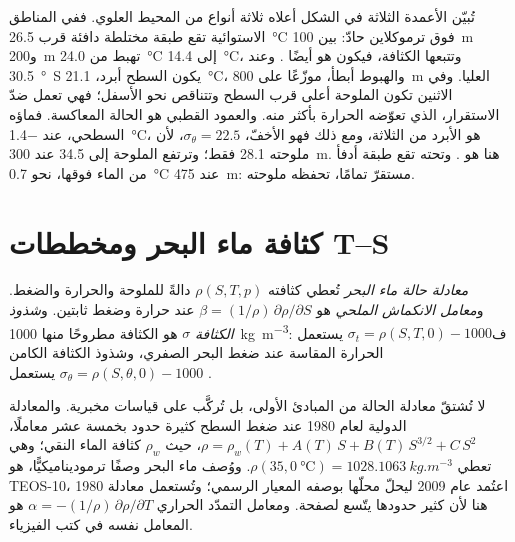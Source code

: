 تُبيّن الأعمدة الثلاثة في الشكل أعلاه ثلاثة أنواع من المحيط العلوي. ففي المناطق الاستوائية تقع طبقة مختلطة دافئة قرب \qty{26.5}{\celsius} فوق ترموكلاين حادّ: بين \qty{100}{m} و\qty{200}{m} تهبط  من \qty{24.0}{\celsius} إلى \qty{14.4}{\celsius}، وتتبعها الكثافة، فيكون  هو أيضًا . وعند \qty{30.5}{\degree S} يكون السطح أبرد، \qty{21.1}{\celsius}، والهبوط أبطأ، موزّعًا على \qty{800}{m} العليا. وفي الاثنين تكون الملوحة أعلى قرب السطح وتتناقص نحو الأسفل؛ فهي تعمل ضدّ الاستقرار، الذي تعوّضه الحرارة بأكثر منه. والعمود القطبي هو الحالة المعاكسة. فماؤه السطحي، عند \qty{-1.4}{\celsius}، هو الأبرد من الثلاثة، ومع ذلك فهو الأخفّ، $\sigma_\theta = 22.5$، لأن ملوحته \num{28.1} فقط؛ وترتفع الملوحة إلى \num{34.5} عند \qty{300}{m}.  هنا هو . وتحته تقع طبقة أدفأ من الماء فوقها، نحو \qty{0.7}{\celsius} عند \qty{475}{m}:  مستقرّ تمامًا، تحفظه ملوحته.

\section{كثافة ماء البحر ومخططات T–S}\label{sec:b1:fluid-envelopes-structure:ts}

\begin{definition}\label{def:b1:fluid-envelopes-structure:eos}
\emph{معادلة حالة ماء البحر} تُعطي كثافته $\rho(S, T, p)$ دالةً للملوحة والحرارة والضغط. و\emph{معامل الانكماش الملحي} هو $\beta = (1/\rho)\,\partial\rho/\partial S$ عند حرارة وضغط ثابتين. و\emph{شذوذ الكثافة} $\sigma$ هو الكثافة مطروحًا منها \qty{1000}{kg.m^{-3}}: ف$\sigma_t = \rho(S, T, 0) -
1000$ يستعمل الحرارة المقاسة عند ضغط البحر الصفري، وشذوذ الكثافة الكامن $\sigma_\theta = \rho(S, \theta, 0) - 1000$ يستعمل .
\end{definition}

لا تُشتقّ معادلة الحالة من المبادئ الأولى، بل تُركَّب على قياسات مخبرية. والمعادلة الدولية لعام 1980 عند ضغط السطح كثيرة حدود بخمسة عشر معاملًا، $\rho = \rho_w(T) +
A(T)\,S + B(T)\,S^{3/2} + C\,S^2$، حيث $\rho_w$ كثافة الماء النقي؛ وهي تعطي $\rho(35, \qty{0}{\celsius}) = \qty{1028.1063}{kg.m^{-3}}$. ووُصف ماء البحر وصفًا ترموديناميكيًّا، هو TEOS-10، اعتُمد عام 2009 ليحلّ محلّها بوصفه المعيار الرسمي؛ وتُستعمل معادلة 1980 هنا لأن كثير حدودها يتّسع لصفحة. ومعامل التمدّد الحراري $\alpha = -(1/\rho)\,\partial\rho/\partial T$ هو المعامل نفسه في كتب الفيزياء.

